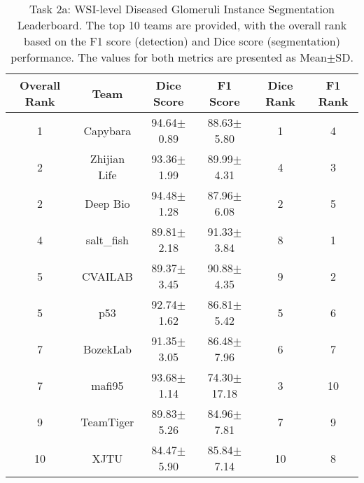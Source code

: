 \begin{table}[t]
\caption{Task 2a: WSI-level Diseased Glomeruli Instance Segmentation Leaderboard. The top 10 teams are provided, with the overall rank based on the F1 score (detection) and Dice score (segmentation) performance. The values for both metrics are presented as Mean$\pm$SD.}
\centering
\scriptsize
\setlength{\tabcolsep}{1.5mm}
\renewcommand\arraystretch{1}
\begin{tabular}{cccccc}
\toprule
Overall Rank & Team & Dice Score & F1 Score & Dice Rank & F1 Rank \\
\midrule
1 & Capybara & 94.64$\pm$0.89 & 88.63$\pm$5.80 & 1 & 4 \\
2 & Zhijian Life & 93.36$\pm$1.99  & 89.99$\pm$4.31 & 4 & 3 \\
2 & Deep Bio & 94.48$\pm$1.28 & 87.96$\pm$6.08 & 2 & 5 \\
4 & salt\_fish & 89.81$\pm$2.18 & 91.33$\pm$3.84 & 8 & 1 \\
5 & CVAILAB & 89.37$\pm$3.45 & 90.88$\pm$4.35 & 9 & 2 \\
5 & p53 & 92.74$\pm$1.62 & 86.81$\pm$5.42 & 5 & 6 \\
7 & BozekLab & 91.35$\pm$3.05 & 86.48$\pm$7.96 & 6 & 7 \\
7 & mafi95 & 93.68$\pm$1.14 & 74.30$\pm$17.18 & 3 & 10 \\
9 & TeamTiger & 89.83$\pm$5.26 & 84.96$\pm$7.81 & 7 & 9 \\
10 & XJTU & 84.47$\pm$5.90 & 85.84$\pm$7.14 & 10 & 8 \\
\bottomrule
\end{tabular}
\label{tab:Task2Leaderboard}
\end{table}
